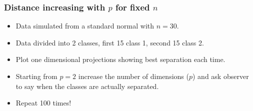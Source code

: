 \documentclass{beamer}
\begin{document}
\begin{frame}
\frametitle{Distance increasing with $p$ for fixed $n$}
\begin{itemize}
\item Data simulated from a standard normal with $n=30$. 
\item Data divided into 2 classes, first 15 class 1, second 15 class 2.
\item Plot one dimensional projections showing best separation each time. 
\item Starting from $p=2$ increase the number of dimensions ($p$) and ask observer to say when the classes are actually separated.
\item Repeat 100 times!
\end{itemize}
\begin{center}

\end{center}
\end{frame}
\end{document}
